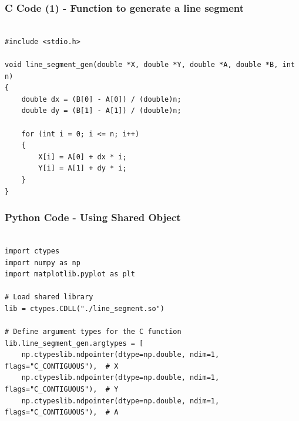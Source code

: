 \documentclass{beamer}
\begin{document}
\begin{frame}[fragile]
    \frametitle{C Code (1) - Function to generate a line segment }

    \begin{lstlisting}

#include <stdio.h>

void line_segment_gen(double *X, double *Y, double *A, double *B, int n)
{
    double dx = (B[0] - A[0]) / (double)n;
    double dy = (B[1] - A[1]) / (double)n;

    for (int i = 0; i <= n; i++)
    {
        X[i] = A[0] + dx * i;
        Y[i] = A[1] + dy * i;
    }
}
    \end{lstlisting}
\end{frame}


\begin{frame}[fragile]
    \frametitle{Python Code - Using Shared Object}
    \begin{lstlisting}

import ctypes
import numpy as np
import matplotlib.pyplot as plt

# Load shared library
lib = ctypes.CDLL("./line_segment.so")

# Define argument types for the C function
lib.line_segment_gen.argtypes = [
    np.ctypeslib.ndpointer(dtype=np.double, ndim=1, flags="C_CONTIGUOUS"),  # X
    np.ctypeslib.ndpointer(dtype=np.double, ndim=1, flags="C_CONTIGUOUS"),  # Y
    np.ctypeslib.ndpointer(dtype=np.double, ndim=1, flags="C_CONTIGUOUS"),  # A
   



\end{lstlisting}
\end{frame}
\end{document}
